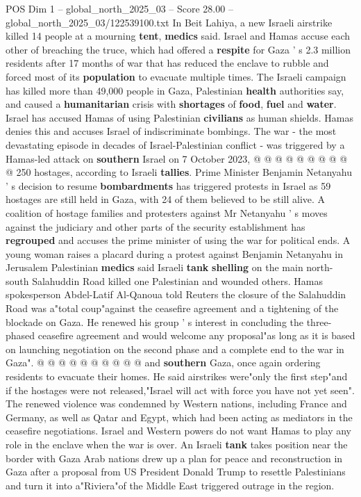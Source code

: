 \begin{textsample}{POS Dim 1 – global\_north\_2025\_03 – Score 28.00 – global\_north\_2025\_03/122539100.txt}
In Beit Lahiya, a new Israeli airstrike killed 14 people at a mourning \textbf{tent}, \textbf{medics} said.
Israel and Hamas accuse each other of breaching the truce, which had offered a \textbf{respite} for Gaza ' s 2.3 million residents after 17 months of war that has reduced the enclave to rubble and forced most of its \textbf{population} to evacuate multiple times.
The Israeli campaign has killed more than 49,000 people in Gaza, Palestinian \textbf{health} authorities say, and caused a \textbf{humanitarian} crisis with \textbf{shortages} of \textbf{food}, \textbf{fuel} and \textbf{water}.
Israel has accused Hamas of using Palestinian \textbf{civilians} as human shields.
Hamas denies this and accuses Israel of indiscriminate bombings.
The war - the most devastating episode in decades of Israel-Palestinian conflict - was triggered by a Hamas-led attack on \textbf{southern} Israel on 7 October 2023, @ @ @ @ @ @ @ @ @ @ 250 hostages, according to Israeli \textbf{tallies}.
Prime Minister Benjamin Netanyahu ' s decision to resume \textbf{bombardments} has triggered protests in Israel as 59 hostages are still held in Gaza, with 24 of them believed to be still alive.
A coalition of hostage families and protesters against Mr Netanyahu ' s moves against the judiciary and other parts of the security establishment has \textbf{regrouped} and accuses the prime minister of using the war for political ends.
A young woman raises a placard during a protest against Benjamin Netanyahu in Jerusalem Palestinian \textbf{medics} said Israeli \textbf{tank} \textbf{shelling} on the main north-south Salahuddin Road killed one Palestinian and wounded others.
Hamas spokesperson Abdel-Latif Al-Qanoua told Reuters the closure of the Salahuddin Road was a"total coup"against the ceasefire agreement and a tightening of the blockade on Gaza.
He renewed his group ' s interest in concluding the three-phased ceasefire agreement and would welcome any proposal"as long as it is based on launching negotiation on the second phase and a complete end to the war in Gaza". @ @ @ @ @ @ @ @ @ @ and \textbf{southern} Gaza, once again ordering residents to evacuate their homes.
He said airstrikes were"only the first step"and if the hostages were not released,"Israel will act with force you have not yet seen".
The renewed violence was condemned by Western nations, including France and Germany, as well as Qatar and Egypt, which had been acting as mediators in the ceasefire negotiations.
Israel and Western powers do not want Hamas to play any role in the enclave when the war is over.
An Israeli \textbf{tank} takes position near the border with Gaza Arab nations drew up a plan for peace and reconstruction in Gaza after a proposal from US President Donald Trump to resettle Palestinians and turn it into a"Riviera"of the Middle East triggered outrage in the region.

\end{textsample}
